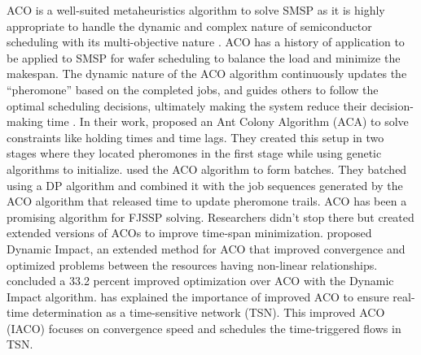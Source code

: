 \vspace{1em}
ACO is a well-suited metaheuristics algorithm to solve SMSP as it is highly appropriate to handle the dynamic and complex nature of semiconductor scheduling with its multi-objective nature \cite{nayar2021ant}. ACO has a history of application to be applied to SMSP for wafer scheduling to balance the load and minimize the makespan. The dynamic nature of the ACO algorithm continuously updates the “pheromone” based on the completed jobs, and guides others to follow the optimal scheduling decisions, ultimately making the system reduce their decision-making time \cite{zhou2022parameter}.
\vspace{1em}
In their work, \cite{li2024modified} proposed an Ant Colony Algorithm (ACA) to solve constraints like holding times and time lags. They created this setup in two stages where they located pheromones in the first stage while using genetic algorithms to initialize. \cite{shao2010minimising} used the ACO algorithm to form batches. They batched using a DP algorithm and combined it with the job sequences generated by the ACO algorithm that released time to update pheromone trails. 
\vspace{1em}
ACO has been a promising algorithm for FJSSP solving. Researchers didn’t stop there but created extended versions of ACOs to improve time-span minimization. \cite{skackauskas2022dynamic} proposed Dynamic Impact, an extended method for ACO that improved convergence and optimized problems between the resources having non-linear relationships. \cite{skackauskas2022dynamic} concluded a 33.2 percent improved optimization over ACO with the Dynamic Impact algorithm. 
\vspace{1em}
\cite{wang2021time} has explained the importance of improved ACO to ensure real-time determination as a time-sensitive network (TSN). This improved ACO (IACO) focuses on convergence speed and schedules the time-triggered flows in TSN.

